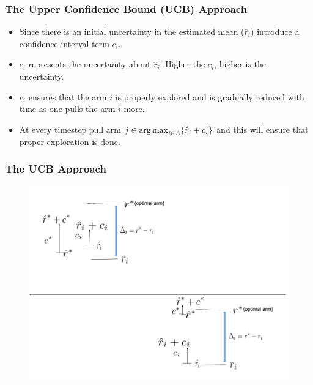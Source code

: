 

\begin{frame}
\frametitle{The Upper Confidence Bound (UCB) Approach}
\begin{itemize}
\item<1-> Since there is an initial uncertainty in the estimated mean ($\hat{r}_i$) introduce a confidence interval term $c_i$.
\item<2-> $c_i$ represents the uncertainty about $\hat{r}_i$. Higher the $c_i$, higher is the uncertainty.
\item<2-> $c_i$ ensures that the arm $i$ is properly explored and is gradually reduced with time as one pulls the arm $i$ more.
\item<3-> At every timestep pull arm $j\in \operatorname*{arg\,max}_{i\in A} \lbrace \hat{r}_i + c_i\rbrace$ and this will ensure that proper exploration is done. 
\end{itemize}
\end{frame}

\begin{frame}
\frametitle{The UCB Approach}
\begin{figure}
\includegraphics[scale=0.3]{img/UCB_Drawing.png}
\end{figure}
\end{frame}



